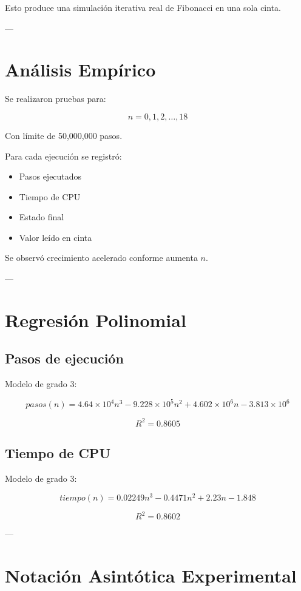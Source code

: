 \documentclass[12pt]{article}
\begin{document}
Esto produce una simulación iterativa real de Fibonacci en una sola cinta.

---

\section{Análisis Empírico}

Se realizaron pruebas para:

\[
n = 0,1,2,\dots,18
\]

Con límite de 50,000,000 pasos.

Para cada ejecución se registró:

\begin{itemize}
\item Pasos ejecutados
\item Tiempo de CPU
\item Estado final
\item Valor leído en cinta
\end{itemize}

Se observó crecimiento acelerado conforme aumenta $n$.

---

\section{Regresión Polinomial}

\subsection{Pasos de ejecución}

Modelo de grado 3:

\[
pasos(n) = 4.64\times10^{4} n^3 - 9.228\times10^{5} n^2 + 4.602\times10^{6} n - 3.813\times10^{6}
\]

\[
R^2 = 0.8605
\]

\subsection{Tiempo de CPU}

Modelo de grado 3:

\[
tiempo(n) = 0.02249 n^3 - 0.4471 n^2 + 2.23 n - 1.848
\]

\[
R^2 = 0.8602
\]

---

\section{Notación Asintótica Experimental}
\end{document}

